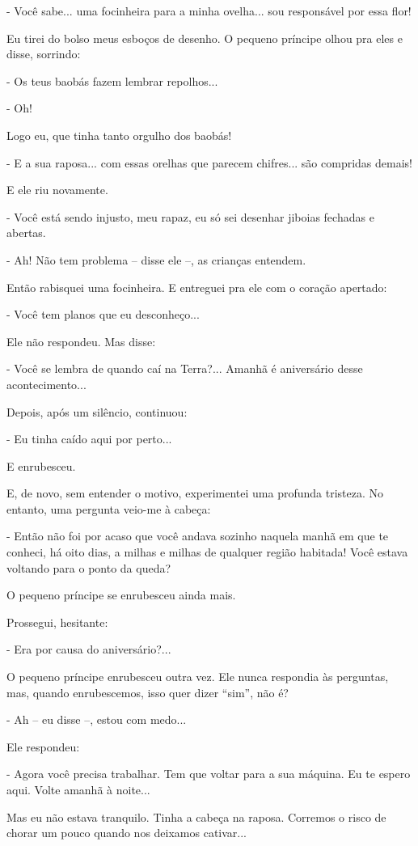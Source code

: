 - Você sabe... uma focinheira para a minha ovelha... sou responsável por
essa flor!

Eu tirei do bolso meus esboços de desenho. O pequeno príncipe olhou pra
eles e disse, sorrindo:

- Os teus baobás fazem lembrar repolhos...

- Oh!

Logo eu, que tinha tanto orgulho dos baobás!

- E a sua raposa... com essas orelhas que parecem chifres... são
compridas demais!

E ele riu novamente.

- Você está sendo injusto, meu rapaz, eu só sei desenhar jiboias
fechadas e abertas.

- Ah! Não tem problema -- disse ele --, as crianças entendem.

Então rabisquei uma focinheira. E entreguei pra ele com o coração
apertado:

- Você tem planos que eu desconheço...

Ele não respondeu. Mas disse:

- Você se lembra de quando caí na Terra?... Amanhã é aniversário desse
acontecimento...

Depois, após um silêncio, continuou:

- Eu tinha caído aqui por perto...

E enrubesceu.

E, de novo, sem entender o motivo, experimentei uma profunda tristeza.
No entanto, uma pergunta veio-me à cabeça:

- Então não foi por acaso que você andava sozinho naquela manhã em que
te conheci, há oito dias, a milhas e milhas de qualquer região habitada!
Você estava voltando para o ponto da queda?

O pequeno príncipe se enrubesceu ainda mais.

Prossegui, hesitante:

- Era por causa do aniversário?...

O pequeno príncipe enrubesceu outra vez. Ele nunca respondia às
perguntas, mas, quando enrubescemos, isso quer dizer ``sim'', não é?

- Ah -- eu disse --, estou com medo...

Ele respondeu:

- Agora você precisa trabalhar. Tem que voltar para a sua máquina. Eu te
espero aqui. Volte amanhã à noite...

Mas eu não estava tranquilo. Tinha a cabeça na raposa. Corremos o risco
de chorar um pouco quando nos deixamos cativar...

